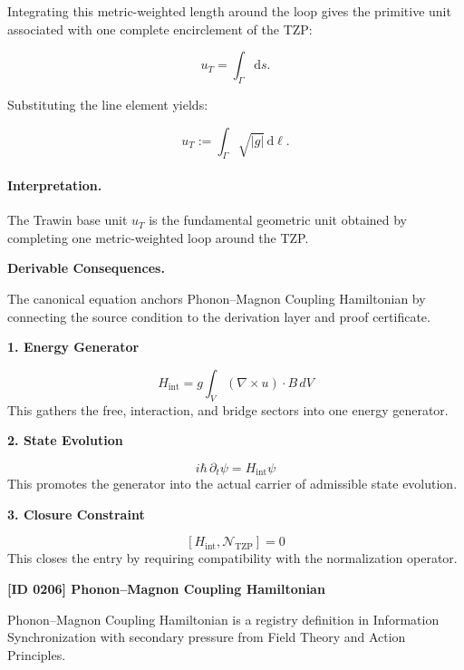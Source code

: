 Integrating this metric-weighted length around the loop gives the primitive unit associated with one complete encirclement of the TZP:

\begin{equation}
u_T = \int_{\Gamma}\mathrm{d}s .
\end{equation}

Substituting the line element yields:

\begin{equation}
\boxed{
u_T := \int_{\Gamma}\sqrt{|g|}\,\mathrm{d}\ell .
}
\end{equation}

\paragraph{Interpretation.}
The Trawin base unit $u_T$ is the fundamental geometric unit obtained by completing one metric-weighted loop around the TZP.

\par\vspace{0.35em}
\noindent\textbf{Derivable Consequences.}\quad
\begingroup
\footnotesize
\raggedright
The canonical equation anchors Phonon--Magnon Coupling Hamiltonian by connecting the source condition to the derivation layer and proof certificate.
\par\endgroup

\noindent\textbf{1. Energy Generator}\par
\[
H_{\mathrm{int}} = g\int_V (\nabla\times u)\cdot B\,dV
\]
\noindent This gathers the free, interaction, and bridge sectors into one energy generator.\par
\noindent\textbf{2. State Evolution}\par
\[
i\hbar\,\partial_t\psi = H_{\mathrm{int}}\psi
\]
\noindent This promotes the generator into the actual carrier of admissible state evolution.\par
\noindent\textbf{3. Closure Constraint}\par
\[
[H_{\mathrm{int}},\mathcal{N}_{\mathrm{TZP}}]=0
\]
\noindent This closes the entry by requiring compatibility with the normalization operator.\par

\clearpage
\noindent\textbf{[ID 0206] Phonon--Magnon Coupling Hamiltonian}\par
\vspace{0.35em}
\begingroup\small
{}
Phonon--Magnon Coupling Hamiltonian is a registry definition in Information Synchronization with secondary pressure from Field Theory and Action Principles.

